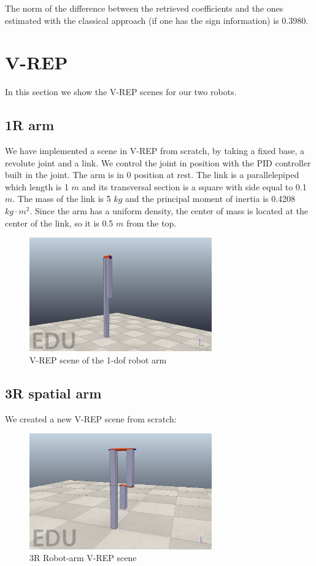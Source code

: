 \documentclass{article}
\begin{document}
\FloatBarrier

The norm of the difference between the retrieved coefficients and the ones estimated with the classical approach (if one has the sign information) is 0.3980.

\clearpage

\section{V-REP}
In this section we show the V-REP scenes for our two robots.

\subsection{1R arm}We have implemented a scene in V-REP from scratch, by taking a fixed base, a revolute joint and a link. We control the joint in position with the PID controller built in the joint. The arm is in 0 position at rest. The link is a parallelepiped which length is 1 $m$ and its transversal section is a square with side equal to 0.1 $m$. The mass of the link is 5 $kg$ and the principal moment of inertia is 0.4208 $kg\cdot m^2$. Since the arm has a uniform density, the center of mass is located at the center of the link, so it is 0.5 $m$ from the top.

\begin{figure}[!htbp]
\centering
\includegraphics[width=0.7\textwidth]{images/1-dof/scene.png}
\caption{V-REP scene of the 1-dof robot arm}
\end{figure}
\FloatBarrier

\subsection{3R spatial arm} We created a new V-REP scene from scratch:
\FloatBarrier
\begin{figure}[!htbp]
\centering
\includegraphics[width=0.7\textwidth]{images/3-dof/scene.png}
\caption{3R Robot-arm V-REP scene}
\end{figure}
\FloatBarrier
\end{document}
